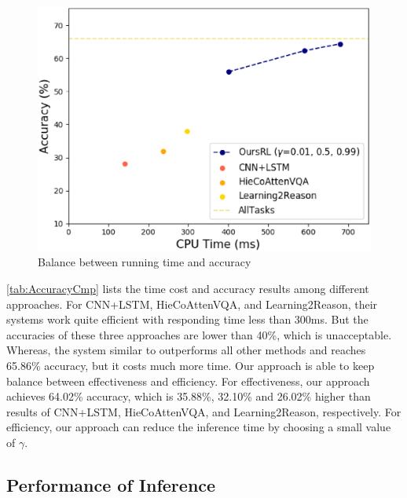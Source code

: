 \begin{figure}[h]
\begin{center}
\includegraphics[width=0.75\linewidth]{figures/TimevsAcc.eps}
\end{center}
\vspace{-3ex}
\caption{Balance between running time and accuracy}
\vspace{-2ex}
\label{fig:TimevsAcc}
\end{figure}
\autoref{tab:AccuracyCmp} lists the time cost and accuracy results among different approaches. For CNN+LSTM, HieCoAttenVQA, and Learning2Reason, their systems work quite efficient with responding time less than 300ms. But the accuracies of these three approaches are lower than 40\%, which is unacceptable. Whereas, the system similar to \cite{peixi2019} outperforms all other methods and reaches 65.86\% accuracy, but it costs much more time. Our approach is able to keep balance between effectiveness and efficiency. For effectiveness, our approach achieves 64.02\% accuracy, which is 35.88\%, 32.10\% and 26.02\% higher than results of CNN+LSTM, HieCoAttenVQA, and Learning2Reason, respectively. For efficiency, our approach can reduce the inference time by choosing a small value of $\gamma$.

\subsection{Performance of Inference} 




